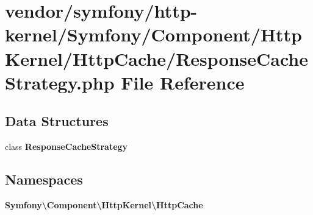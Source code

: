 \section{vendor/symfony/http-\/kernel/\+Symfony/\+Component/\+Http\+Kernel/\+Http\+Cache/\+Response\+Cache\+Strategy.php File Reference}
\label{_response_cache_strategy_8php}
\subsection*{Data Structures}
\begin{DoxyCompactItemize}
\item 
class {\bf Response\+Cache\+Strategy}
\end{DoxyCompactItemize}
\subsection*{Namespaces}
\begin{DoxyCompactItemize}
\item 
 {\bf Symfony\textbackslash{}\+Component\textbackslash{}\+Http\+Kernel\textbackslash{}\+Http\+Cache}
\end{DoxyCompactItemize}
